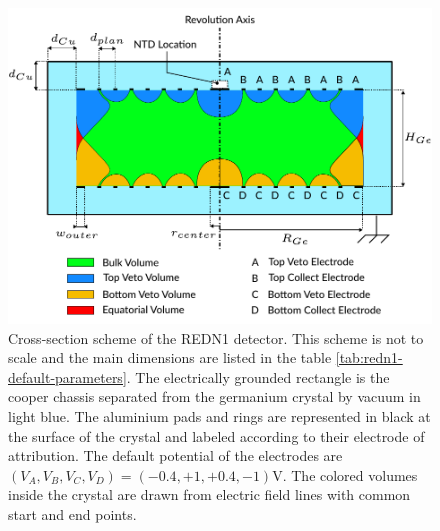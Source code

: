 \begin{figure}
\centering
\includegraphics[scale=1]{Figures/ElectrodesExperimental/scheme_redn1.pdf}
\caption{Cross-section scheme of the REDN1 detector. This scheme is not to scale and the main dimensions are listed in the table \ref{tab:redn1-default-parameters}. The electrically grounded rectangle is the cooper chassis separated from the germanium crystal by vacuum in light blue. The aluminium pads and rings are represented in black at the surface of the crystal and labeled according to their electrode of attribution. The default potential of the electrodes are $(V_A, V_B, V_C, V_D) = (-0.4, +1, +0.4, -1) \si{\volt}$. The colored volumes inside the crystal are drawn from electric field lines with common start and end points.}
\label{fig:redn1-scheme}
\end{figure}

